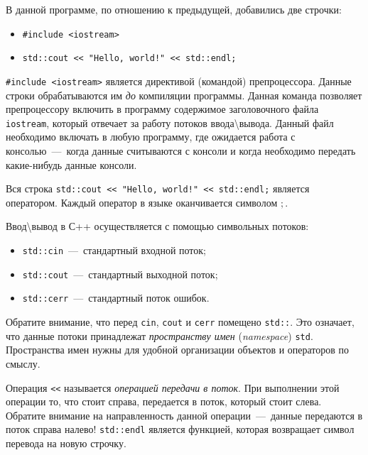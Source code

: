В данной программе, по отношению к предыдущей, добавились две строчки:

\begin{itemize}
    \item \lstinline!#include <iostream>!
    \item \lstinline|std::cout << "Hello, world!" << std::endl;|
\end{itemize}

\lstinline!#include <iostream>! является директивой (командой) препроцессора. Данные строки обрабатываются им \emph{до} компиляции программы. Данная команда позволяет препроцессору включить в программу содержимое заголовочного файла \lstinline!iostream!, который отвечает за работу потоков ввода\textbackslash вывода. Данный файл необходимо включать в любую программу, где ожидается работа с консолью~---~когда данные считываются с консоли и когда необходимо передать какие-нибудь данные консоли.

Вся строка \lstinline|std::cout << "Hello, world!" << std::endl;| является оператором. Каждый оператор в языке оканчивается символом $;$.

Ввод\textbackslash вывод в С++ осуществляется с помощью символьных потоков:
\begin{itemize}
    \item \lstinline!std::cin!~---~стандартный входной поток;
    \item \lstinline!std::cout!~---~стандартный выходной поток;
    \item \lstinline!std::cerr!~---~стандартный поток ошибок.
\end{itemize}

Обратите внимание, что перед \lstinline|cin|, \lstinline|cout| и \lstinline|cerr| помещено \texttt{std::}. Это означает, что данные потоки принадлежат \textit{пространству имен} (\textit{namespace}) \texttt{std}. Пространства имен нужны для удобной организации объектов и операторов по смыслу.

Операция \lstinline|<<| называется \emph{операцией передачи в поток}. При выполнении этой операции то, что стоит справа, передается в поток, который стоит слева. Обратите внимание на направленность данной операции~---~данные передаются в поток справа налево! \lstinline|std::endl| является функцией, которая возвращает символ перевода на новую строчку.

